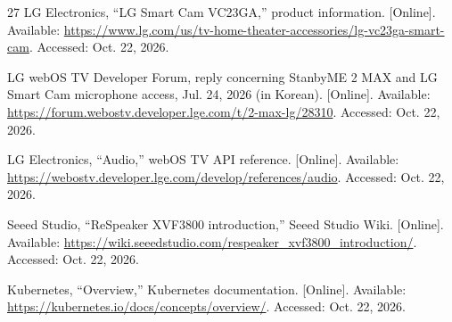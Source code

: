 \begin{thebibliography}{27}
LG Electronics, ``LG Smart Cam VC23GA,'' product information. [Online]. Available: \url{https://www.lg.com/us/tv-home-theater-accessories/lg-vc23ga-smart-cam}. Accessed: Oct. 22, 2026.

LG webOS TV Developer Forum, reply concerning StanbyME 2 MAX and LG Smart Cam microphone access, Jul. 24, 2026 (in Korean). [Online]. Available: \url{https://forum.webostv.developer.lge.com/t/2-max-lg/28310}. Accessed: Oct. 22, 2026.

LG Electronics, ``Audio,'' webOS TV API reference. [Online]. Available: \url{https://webostv.developer.lge.com/develop/references/audio}. Accessed: Oct. 22, 2026.

Seeed Studio, ``ReSpeaker XVF3800 introduction,'' Seeed Studio Wiki. [Online]. Available: \url{https://wiki.seeedstudio.com/respeaker_xvf3800_introduction/}. Accessed: Oct. 22, 2026.

Kubernetes, ``Overview,'' Kubernetes documentation. [Online]. Available: \url{https://kubernetes.io/docs/concepts/overview/}. Accessed: Oct. 22, 2026.

\end{thebibliography}
